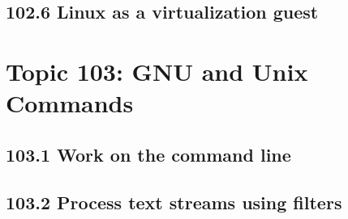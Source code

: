 \documentclass[12pt,a4paper]{report}
\begin{document}
\section*{102.6 Linux as a virtualization guest}




\chapter{Topic 103: GNU and Unix Commands}


\section*{103.1 Work on the command line}




\section*{103.2 Process text streams using filters}

\end{document}
